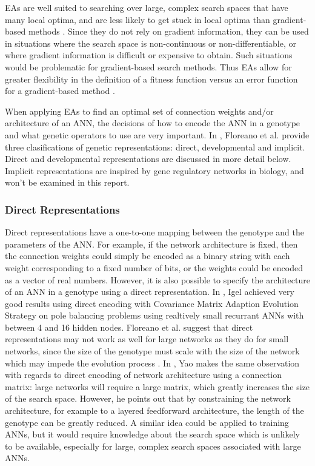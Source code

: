 \documentclass[12pt]{article} %
\begin{document}
EAs are well suited to searching over large, complex search spaces that have many local optima, and are less likely to get stuck in local optima than gradient-based methods \cite{Yao1999}. Since they do not rely on gradient information, they can be used in situations where the search space is non-continuous or non-differentiable, or where gradient information is difficult or expensive to obtain. Such situations would be problematic for gradient-based search methods. Thus EAs allow for greater flexibility in the definition of a fitness function versus an error function for a gradient-based method \cite{Floreano2008}\cite{Yao1999}.

When applying EAs to find an optimal set of connection weights and/or architecture of an ANN, the decisions of how to encode the ANN in a genotype and what genetic operators to use are very important. In \cite{Floreano2008}, Floreano et al. provide three clasifications of genetic representations: direct, developmental and implicit. Direct and developmental representations are discussed in more detail below. Implicit representations are inspired by gene regulatory networks in biology, and won't be examined in this report.

\subsubsection{Direct Representations}

Direct representations have a one-to-one mapping between the genotype and the parameters of the ANN. For example, if the network architecture is fixed, then the connection weights could simply be encoded as a binary string with each weight corresponding to a fixed number of bits, or the weights could be encoded as a vector of real numbers. However, it is also possible to specify the architecture of an ANN in a genotype using a direct representation. In \cite{Igel2003}, Igel achieved very good results using direct encoding with Covariance Matrix Adaption Evolution Strategy on pole balancing problems using realtively small recurrant ANNs with between 4 and 16 hidden nodes. Floreano et al. suggest that direct representations may not work as well for large networks as they do for small networks, since the size of the genotype must scale with the size of the network which may impede the evolution process \cite{Floreano2008}. In \cite{Yao1999}, Yao makes the same observation with regards to direct encoding of network architecture using a connection matrix: large networks will require a large matrix, which greatly increases the size of the search space. However, he points out that by constraining the network architecture, for example to a layered feedforward architecture, the length of the genotype can be greatly reduced. A similar idea could be applied to training ANNs, but it would require knowledge about the search space which is unlikely to be available, especially for large, complex search spaces associated with large ANNs.
\end{document}
